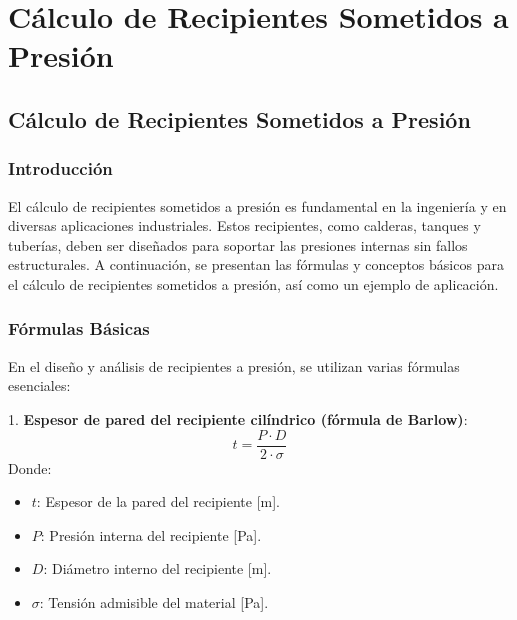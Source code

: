 \documentclass[../main]{subfiles}
\begin{document}
\chapter{Cálculo de Recipientes Sometidos a Presión}

\section{Cálculo de Recipientes Sometidos a Presión}

\subsection{Introducción}

El cálculo de recipientes sometidos a presión es fundamental en la ingeniería y en diversas aplicaciones industriales. Estos recipientes, como calderas, tanques y tuberías, deben ser diseñados para soportar las presiones internas sin fallos estructurales. A continuación, se presentan las fórmulas y conceptos básicos para el cálculo de recipientes sometidos a presión, así como un ejemplo de aplicación.


\subsection{Fórmulas Básicas}

En el diseño y análisis de recipientes a presión, se utilizan varias fórmulas esenciales:

1. \textbf{Espesor de pared del recipiente cilíndrico (fórmula de Barlow)}:
    \begin{equation}
    t = \dfrac{P \cdot D}{2 \cdot \sigma}
    \end{equation}
    Donde:
    \begin{itemize}
        \item $t$: Espesor de la pared del recipiente [m].
        \item $P$: Presión interna del recipiente [Pa].
        \item $D$: Diámetro interno del recipiente [m].
        \item $\sigma$: Tensión admisible del material [Pa].
    \end{itemize}
\end{document}
